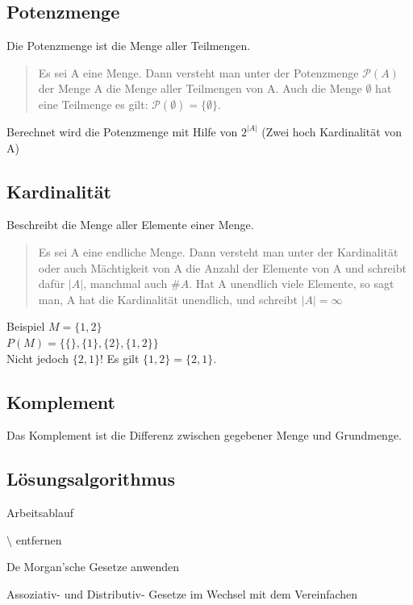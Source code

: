\documentclass[german]{latex4ei/latex4ei_sheet}
\begin{document}
\begin{sectionbox}
	
\subsection{Potenzmenge}
	Die Potenzmenge ist die Menge aller Teilmengen.
	\begin{quote}
	Es sei A eine Menge. Dann versteht man unter der Potenzmenge $\mathcal{P}(A)$ der Menge A die Menge aller Teilmengen von A. Auch die Menge $\emptyset$ hat eine Teilmenge es gilt: $\mathcal{P}(\emptyset) = \lbrace \emptyset \rbrace$.
	\end{quote}
	
	Berechnet wird die Potenzmenge mit Hilfe von $2^{\vert A \vert}$ (Zwei hoch Kardinalität von A)

\subsection{Kardinalität}
	Beschreibt die Menge aller Elemente einer Menge.
	
	\begin{quote}
	Es sei A eine endliche Menge. Dann versteht man unter der Kardinalität oder auch Mächtigkeit von A die Anzahl der Elemente von A und schreibt dafür $\vert A \vert$, manchmal auch $\#A$. Hat A unendlich viele Elemente, so sagt man, A hat die Kardinalität unendlich, und schreibt $\vert A \vert = \infty$
	\end{quote}
	
	\begin{cookbox}{Beispiel}
		$M = \lbrace 1, 2\rbrace$ \\
		$P\left(M \right) = \lbrace \lbrace \rbrace, \lbrace 1 \rbrace, \lbrace 2 \rbrace, \lbrace 1, 2 \rbrace \rbrace $ \\
		Nicht jedoch $\lbrace 2,1 \rbrace$! Es gilt $\lbrace 1,2 \rbrace = \lbrace 2,1 \rbrace$.

	\end{cookbox}

\subsection{Komplement}
	Das Komplement ist die Differenz zwischen gegebener Menge und Grundmenge. 
	
\subsection{Lösungsalgorithmus}
\begin{cookbox}{Arbeitsablauf}
		\item $\setminus$ entfernen
		\item De Morgan'sche Gesetze anwenden
		\item Assoziativ- und Distributiv- Gesetze im Wechsel mit dem Vereinfachen
	\end{cookbox}


\end{sectionbox}
\end{document}
